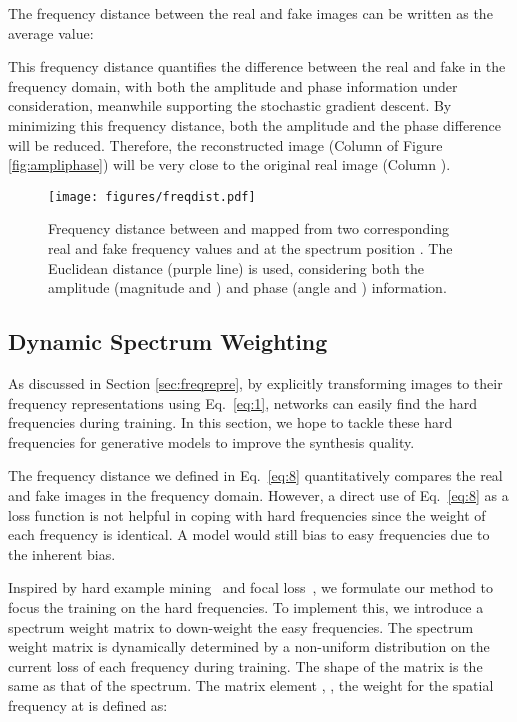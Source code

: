 \documentclass[10pt,twocolumn,letterpaper]{article}
\begin{document}
The frequency distance between the real and fake images can be written as the average value: 



This frequency distance quantifies the difference between the real and fake in the frequency domain, with both the amplitude and phase information under consideration, meanwhile supporting the stochastic gradient descent.
By minimizing this frequency distance, both the amplitude and the phase difference will be reduced. Therefore, the reconstructed image (Column  of Figure \ref{fig:ampliphase}) will be very close to the original real image (Column ).
\fi


\begin{figure}[t]
	\centering
\texttt{[image: figures/freqdist.pdf]}
\caption{Frequency distance between  and  mapped from two corresponding real and fake frequency values  and  at the spectrum position . The Euclidean distance (purple line) is used, considering both the amplitude (magnitude  and ) and phase (angle  and ) information.}
	\label{fig:freqdist}
	\vspace{-0.2cm}
\end{figure}


\subsection{Dynamic Spectrum Weighting}
\label{sec:weightmatrix}



As discussed in Section \ref{sec:freqrepre}, by explicitly transforming images to their frequency representations using Eq.~\eqref{eq:1}, networks can easily find the hard frequencies during training.
In this section, we hope to tackle these hard frequencies for generative models to improve the synthesis quality.
\fi

The frequency distance we defined in Eq.~\eqref{eq:8} quantitatively compares the real and fake images in the frequency domain.
However, a direct use of Eq.~\eqref{eq:8} as a loss function is not helpful in coping with hard frequencies since the weight of each frequency is identical. A model would still bias to easy frequencies due to the inherent bias. 

Inspired by hard example mining~\cite{hempartmodel,ohem} and focal loss~\cite{focalloss}, we formulate our method to focus the training on the hard frequencies. To implement this, we introduce a spectrum weight matrix to down-weight the easy frequencies.
The spectrum weight matrix is dynamically determined by a non-uniform distribution on the current loss of each frequency during training.
The shape of the matrix is the same as that of the spectrum.
The matrix element , \ie, the weight for the spatial frequency at  is defined as:
\end{document}
